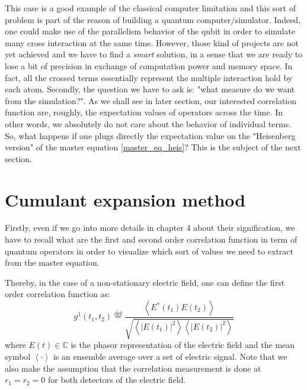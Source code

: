 \documentclass[11pt]{report}
\begin{document}
This case is a good example of the classical computer limitation and this sort of problem is part of the reason of building a quantum computer/simulator. Indeed, one could make use of the parallelism behavior of the qubit in order to simulate many cross interaction at the same time. However, those kind of projects are not yet achieved and we have to find a \textit{smart} solution, in a sense that we are ready to lose a bit of precision in exchange of computation power and memory space. In fact, all the crossed terms essentially represent the multiple interaction hold by each atom. Secondly, the question we have to ask is: "what measure do we want from the simulation?". As we shall see in later section, our interested correlation function are, roughly, the expectation values of operators across the time. In other words, we absolutely do not care about the behavior of individual terms. So, what happens if one plugs directly the expectation value on the "Heisenberg version" of the master equation \eqref{master_eq_heis}? This is the subject of the next section.

\section{Cumulant expansion method}

Firstly, even if we go into more details in chapter 4 about their signification, we have to recall what are the first and second order correlation function in term of quantum operators in order to visualize which sort of values we need to extract from the master equation.

Thereby, in the case of a non-stationary electric field, one can define the first order correlation function as:
\begin{equation}
\label{g1_classic_def}
{\displaystyle g ^{1}(t_{1},t_{2})\stackrel{\text{def}}{=}{\frac {\left\langle E^{*}(t_{1})E(t_{2})\right\rangle }{\sqrt{\left\langle \left|E(t_{1})\right|^{2}\right\rangle \left\langle \left|E(t_{2})\right|^{2}\right\rangle }}}}
\end{equation}
where $E(t) \in \mathbb{C}$ is the phasor representation of the electric field and the mean symbol $\left\langle \cdot \right\rangle$ is an ensemble average over a set of electric signal. Note that we also make the assumption that the correlation measurement is done at $r_1 = r_2 = 0$ for both detectors of the electric field.
\end{document}
